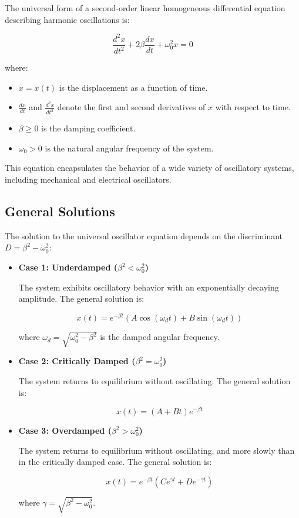 \documentclass[12pt,a4paper]{article}
\begin{document}
The universal form of a second-order linear homogeneous differential equation describing harmonic oscillations is:

\[
\frac{d^2 x}{dt^2} + 2\beta \frac{dx}{dt} + \omega_0^2 x = 0
\]

where:

\begin{itemize}
    \item \( x = x(t) \) is the displacement as a function of time.
    \item \( \frac{dx}{dt} \) and \( \frac{d^2 x}{dt^2} \) denote the first and second derivatives of \( x \) with respect to time.
    \item \( \beta \geq 0 \) is the damping coefficient.
    \item \( \omega_0 > 0 \) is the natural angular frequency of the system.
\end{itemize}

This equation encapsulates the behavior of a wide variety of oscillatory systems, including mechanical and electrical oscillators.

\subsection{General Solutions}

The solution to the universal oscillator equation depends on the discriminant \( D = \beta^2 - \omega_0^2 \):

\begin{itemize}
    \item \textbf{Case 1: Underdamped (\( \beta^2 < \omega_0^2 \))}

    The system exhibits oscillatory behavior with an exponentially decaying amplitude. The general solution is:

    \[
    x(t) = e^{-\beta t} \left( A \cos(\omega_d t) + B \sin(\omega_d t) \right)
    \]

    where \( \omega_d = \sqrt{\omega_0^2 - \beta^2} \) is the damped angular frequency.

    \item \textbf{Case 2: Critically Damped (\( \beta^2 = \omega_0^2 \))}

    The system returns to equilibrium without oscillating. The general solution is:

    \[
    x(t) = (A + B t) e^{-\beta t}
    \]

    \item \textbf{Case 3: Overdamped (\( \beta^2 > \omega_0^2 \))}

    The system returns to equilibrium without oscillating, and more slowly than in the critically damped case. The general solution is:

    \[
    x(t) = e^{-\beta t} \left( C e^{\gamma t} + D e^{-\gamma t} \right)
    \]

    where \( \gamma = \sqrt{\beta^2 - \omega_0^2} \).
\end{itemize}
\end{document}
